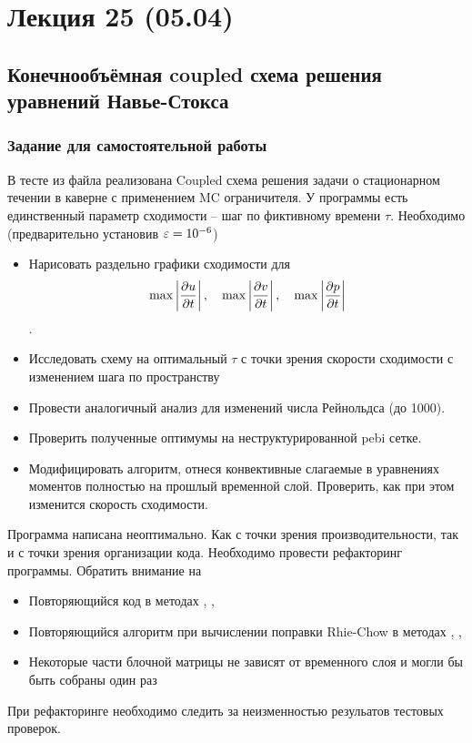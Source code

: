 \section{Лекция 25 (05.04)}


\subsection{Конечнообъёмная coupled схема решения уравнений Навье-Стокса}
\subsubsection{Задание для самостоятельной работы}
В тесте  из файла 
реализована Coupled схема решения задачи о стационарном течении в каверне
с применением MC ограничителя.
У программы есть единственный параметр сходимости -- шаг по фиктивному времени $\tau$.
Необходимо (предварительно установив $\varepsilon=10^{-6}$)
\begin{itemize}
\item  Нарисовать раздельно графики сходимости для 
       $$\max\left|\frac{\partial u}{\partial t}\right|,\quad
         \max\left|\frac{\partial v}{\partial t}\right|,\quad
         \max\left|\frac{\partial p}{\partial t}\right|$$. 
\item  Исследовать схему на оптимальный $\tau$ с точки зрения скорости сходимости с изменением шага по пространству
\item  Провести аналогичный анализ для изменений числа Рейнольдса (до 1000).
\item  Проверить полученные оптимумы на неструктурированной pebi сетке.
\item  Модифицировать алгоритм, отнеся конвективные слагаемые в уравнениях моментов полностью на прошлый временной слой.
       Проверить, как при этом изменится скорость сходимости.
\end{itemize}

Программа написана неоптимально. Как с точки зрения производительности, так и с точки зрения организации кода. Необходимо
провести рефакторинг программы. Обратить внимание на
\begin{itemize}
\item Повторяющийся код в методах , ,
\item Повторяющийся алгоритм при вычислении поправки Rhie-Chow в методах , ,
\item Некоторые части блочной матрицы не зависят от временного слоя и могли бы быть собраны один раз
\end{itemize}
При рефакторинге необходимо следить за неизменностью резульатов тестовых проверок.
